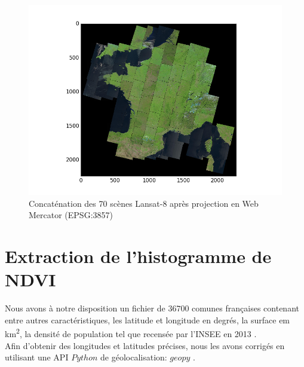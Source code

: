 \documentclass{book}
\begin{document}
\begin{figure}[H]
\begin{center}
\includegraphics[scale=0.7]{images/france-covering.png}
\end{center}
\caption{Concaténation des 70 scènes Lansat-8 après projection en Web Mercator (EPSG:3857)}
\label{couverture}
\end{figure}
\clearpage

\chapter{Extraction de l'histogramme de NDVI}

Nous avons à notre disposition un fichier de $36700$ comunes françaises contenant entre autres caractéristiques, les latitude et longitude en degrés,
la surface em km\textsuperscript{2}, la densité de population tel que recensée par l'INSEE en 2013 \cite{insee_pop2013}.\\
Afin d'obtenir des longitudes et latitudes précises, nous les avons corrigés en utilisant une API $Python$ de géolocalisation: $geopy$ \cite{geopy}.\\
\end{document}
